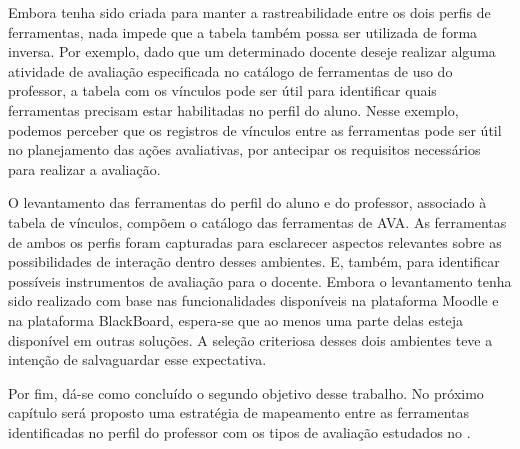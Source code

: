 Embora tenha sido criada para manter a rastreabilidade entre os dois perfis de ferramentas, nada impede que a tabela também possa ser utilizada de forma inversa. Por exemplo, dado que um determinado docente deseje realizar alguma atividade de avaliação especificada no catálogo de ferramentas de uso do professor, a tabela com os vínculos pode ser útil para identificar quais ferramentas precisam estar habilitadas no perfil do aluno. Nesse exemplo, podemos perceber que os registros de vínculos entre as ferramentas pode ser útil no planejamento das ações avaliativas, por antecipar os requisitos necessários para realizar a avaliação.

O levantamento das ferramentas do perfil do aluno e do professor, associado à tabela de vínculos, compõem o catálogo das ferramentas de AVA. As ferramentas de ambos os perfis foram capturadas para esclarecer aspectos relevantes sobre as possibilidades de interação dentro desses ambientes. E, também, para identificar possíveis instrumentos de avaliação para o docente. Embora o levantamento tenha sido realizado com base nas funcionalidades disponíveis na plataforma Moodle e na plataforma BlackBoard, espera-se que ao menos uma parte delas esteja disponível em outras soluções. A seleção criteriosa desses dois ambientes teve a intenção de salvaguardar esse expectativa.

Por fim, dá-se como concluído o segundo objetivo desse trabalho. No próximo capítulo será proposto uma estratégia de mapeamento entre as ferramentas identificadas no perfil do professor com os tipos de avaliação estudados no .


